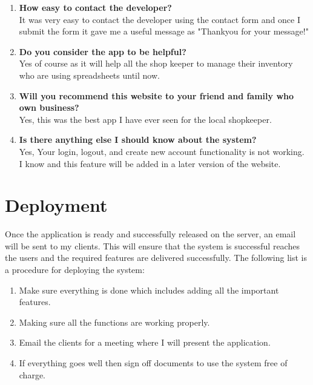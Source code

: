 \begin{enumerate}
    \item\textbf{How easy to contact the developer?}\\
    It was very easy to contact the developer using the contact form and once I submit the form it gave me a useful message as "Thankyou for your message!"
    
    \item \textbf{Do you consider the app to be helpful?}\\
    Yes of course as it will help all the shop keeper to manage their inventory who are using spreadsheets until now.
    
    \item \textbf{Will you recommend this website to your friend and family who own business?} \\
    Yes, this was the best app I have ever seen for the local shopkeeper.  
    
    \item \textbf{Is there anything else I should know about the system? }\\
    Yes, Your login, logout, and create new account functionality is not working. I know and this feature will be added in a later version of the website.
\end{enumerate}

\section{Deployment}
Once the application is ready and successfully released on the server, an email will be sent to my clients. This will ensure that the system is successful reaches the users and the required features are delivered successfully. The following list is a procedure for deploying the system:
\begin{enumerate}
    \item Make sure everything is done which includes adding all the important features.
    \item Making sure all the functions are working properly.
    \item Email the clients for a meeting where I will present the application.
    \item If everything goes well then sign off documents to use the system free of charge.
\end{enumerate}